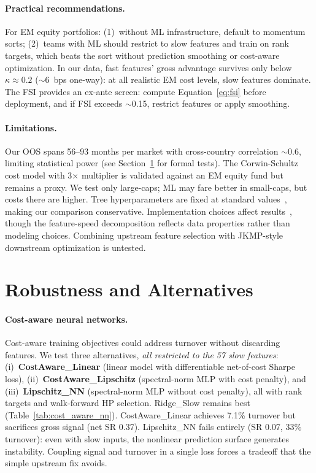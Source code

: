 \documentclass[sigconf,balance=false]{acmart}
\begin{document}
\paragraph{Practical recommendations.}
For EM equity portfolios: (1)~without ML infrastructure, default to
momentum sorts; (2)~teams with ML should restrict to
slow features and train on rank targets, which beats the sort without
prediction smoothing or cost-aware optimization. In our data, fast features'
gross advantage survives only below $\kappa \approx 0.2$
(${\sim}$6~bps one-way): at all realistic EM cost levels, slow
features dominate.
The FSI provides an ex-ante screen: compute Equation~\ref{eq:fsi} before
deployment, and if FSI exceeds $\sim$0.15, restrict features or apply
smoothing.

\paragraph{Limitations.}
Our OOS spans 56--93 months per market with cross-country correlation
${\sim}$0.6, limiting statistical power (see
Section~\ref{sec:robustness} for formal tests). The Corwin-Schultz
cost model with 3$\times$ multiplier is validated against an EM equity
fund but remains a proxy. We test only large-caps; ML may fare better
in small-caps, but costs there are higher. Tree hyperparameters are
fixed at standard values~\cite{gu2020empirical}, making our comparison
conservative. Implementation choices affect
results~\cite{chen2025nonstandard}, though the feature-speed
decomposition reflects data properties rather than modeling choices.
Combining upstream feature selection with JKMP-style downstream
optimization is untested.


\section{Robustness and Alternatives}
\label{sec:robustness}

\paragraph{Cost-aware neural networks.}
Cost-aware training objectives could address turnover without
discarding features. We test three alternatives, \emph{all restricted
to the 57 slow features}: (i)~\textbf{CostAware\_\allowbreak Linear} (linear model
with differentiable net-of-cost Sharpe loss),
(ii)~\textbf{CostAware\_\allowbreak Lipschitz} (spectral-norm MLP with cost
penalty), and (iii)~\textbf{Lipschitz\_\allowbreak NN} (spectral-norm MLP without
cost penalty), all with rank targets and walk-forward HP selection.
Ridge\_Slow remains best (Table~\ref{tab:cost_aware_nn}).
CostAware\_Linear achieves 7.1\% turnover but sacrifices gross signal
(net SR 0.37). Lipschitz\_NN fails entirely (SR 0.07, 33\% turnover):
even with slow inputs, the nonlinear prediction surface generates
instability. Coupling signal and turnover in a single loss forces a
tradeoff that the simple upstream fix avoids.
\end{document}
